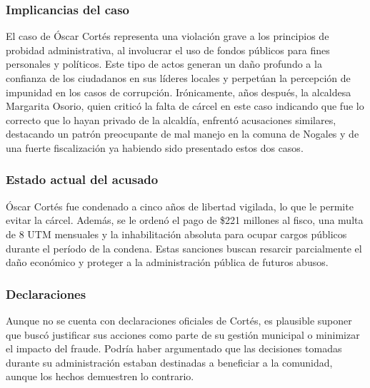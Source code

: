 \documentclass[letter,12pt]{article}
\begin{document}
	\subsubsection{Implicancias del caso}
	El caso de Óscar Cortés representa una violación grave a los principios de probidad administrativa, al involucrar el uso de fondos públicos para fines personales y políticos. Este tipo de actos generan un daño profundo a la confianza de los ciudadanos en sus líderes locales y perpetúan la percepción de impunidad en los casos de corrupción. Irónicamente, años después, la alcaldesa Margarita Osorio, quien criticó la falta de cárcel en este caso indicando que fue lo correcto que lo hayan privado de la alcaldía, enfrentó acusaciones similares, destacando un patrón preocupante de mal manejo en la comuna de Nogales y de una fuerte fiscalización ya habiendo sido presentado estos dos casos.\cite{oscar2}\\
	
	\subsubsection{Estado actual del acusado}
	Óscar Cortés fue condenado a cinco años de libertad vigilada, lo que le permite evitar la cárcel. Además, se le ordenó el pago de \$221 millones al fisco, una multa de 8 UTM mensuales y la inhabilitación absoluta para ocupar cargos públicos durante el período de la condena. Estas sanciones buscan resarcir parcialmente el daño económico y proteger a la administración pública de futuros abusos.\cite{oscar3}\\
	
	\subsubsection{Declaraciones}
	Aunque no se cuenta con declaraciones oficiales de Cortés, es plausible suponer que buscó justificar sus acciones como parte de su gestión municipal o minimizar el impacto del fraude. Podría haber argumentado que las decisiones tomadas durante su administración estaban destinadas a beneficiar a la comunidad, aunque los hechos demuestren lo contrario.
	
	\newpage
	\printbibliography[heading=bibintoc, title=Referencias]
\end{document}
